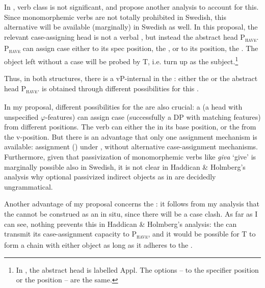 \documentclass[output=paper]{langscibook}
\begin{document}
In , verb class is not significant, and \citet{HaddicanHolmberg2019} propose another analysis to account for this. Since  monomorphemic  verbs are not totally prohibited in Swedish, this alternative will be available (marginally) in Swedish as well. In this proposal, the relevant case-assigning head is not a verbal , but instead the abstract head P\textsc{\textsubscript{have}}. P\textsc{\textsubscript{have}} can assign case either to its spec position, the , or to its  position, the . The object left without a case will be probed by T, i.e. turn up as the subject.\footnote{In \citet{HolmbergEtAl2019}, the abstract head is labelled Appl. The options –  to the specifier position or the  position – are the same.} 



Thus, in both structures, there is a vP-internal  in the : either the  or the abstract head P\textsc{\textsubscript{have}}.  is obtained through different possibilities for this . 



In my proposal, different possibilities for the  are also crucial: a  (a head with unspecified $\varphi ${}-features) can assign case (successfully  a DP with matching features) from different positions. The verb can either  the  in its base position, or the  from the v-position. But there is an advantage that only one assignment mechanism is available: assignment () under , without alternative case-assignment mechanisms. Furthermore, given that passivization of monomorphemic verbs like \textit{giva} ‘give’ is marginally possible also in Swedish, it is not clear in Haddican \& Holmberg’s analysis why optional passivized indirect objects as in  are decidedly ungrammatical.



Another advantage of my proposal concerns the : it follows from my analysis that the  cannot be construed as an  in situ, since there will be a case clash. As far as I can see, nothing prevents this in Haddican \& Holmberg’s analysis: the  can transmit its case-assignment capacity to P\textsc{\textsubscript{have}}, and it would be possible for T to form a chain with either object as long as it adheres to the .
\end{document}
